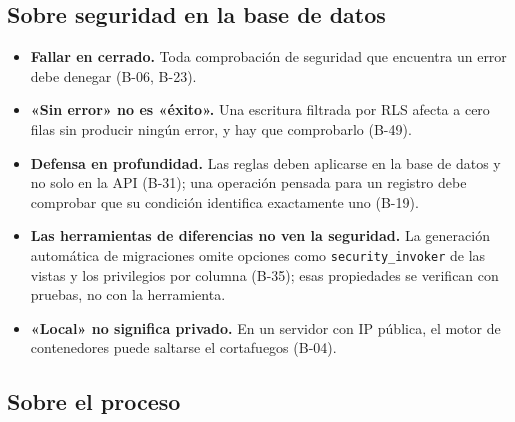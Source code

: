 \subsection{Sobre seguridad en la base de datos}

\begin{itemize}
  \item \textbf{Fallar en cerrado.} Toda comprobación de seguridad que
        encuentra un error debe denegar (B-06, B-23).
  \item \textbf{«Sin error» no es «éxito».} Una escritura filtrada por RLS
        afecta a cero filas sin producir ningún error, y hay que comprobarlo
        (B-49).
  \item \textbf{Defensa en profundidad.} Las reglas deben aplicarse en la
        base de datos y no solo en la API (B-31); una operación pensada para un
        registro debe comprobar que su condición identifica exactamente uno
        (B-19).
  \item \textbf{Las herramientas de diferencias no ven la seguridad.} La
        generación automática de migraciones omite opciones como
        \texttt{security\_invoker} de las vistas y los privilegios por columna
        (B-35); esas propiedades se verifican con pruebas, no con la
        herramienta.
  \item \textbf{«Local» no significa privado.} En un servidor con IP pública,
        el motor de contenedores puede saltarse el cortafuegos (B-04).
\end{itemize}

\subsection{Sobre el proceso}

